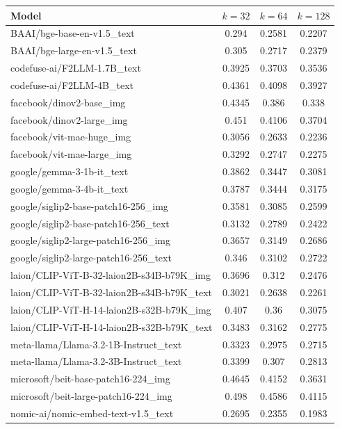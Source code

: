 \begin{table}[ht]
\centering
\begin{tabular}{lccc}
\hline
Model & $k=32$ & $k=64$ & $k=128$ \\
\hline
BAAI/bge-base-en-v1.5\_text & 0.294 & 0.2581 & 0.2207 \\
BAAI/bge-large-en-v1.5\_text & 0.305 & 0.2717 & 0.2379 \\
codefuse-ai/F2LLM-1.7B\_text & 0.3925 & 0.3703 & 0.3536 \\
codefuse-ai/F2LLM-4B\_text & 0.4361 & 0.4098 & 0.3927 \\
facebook/dinov2-base\_img & 0.4345 & 0.386 & 0.338 \\
facebook/dinov2-large\_img & 0.451 & 0.4106 & 0.3704 \\
facebook/vit-mae-huge\_img & 0.3056 & 0.2633 & 0.2236 \\
facebook/vit-mae-large\_img & 0.3292 & 0.2747 & 0.2275 \\
google/gemma-3-1b-it\_text & 0.3862 & 0.3447 & 0.3081 \\
google/gemma-3-4b-it\_text & 0.3787 & 0.3444 & 0.3175 \\
google/siglip2-base-patch16-256\_img & 0.3581 & 0.3085 & 0.2599 \\
google/siglip2-base-patch16-256\_text & 0.3132 & 0.2789 & 0.2422 \\
google/siglip2-large-patch16-256\_img & 0.3657 & 0.3149 & 0.2686 \\
google/siglip2-large-patch16-256\_text & 0.346 & 0.3102 & 0.2722 \\
laion/CLIP-ViT-B-32-laion2B-s34B-b79K\_img & 0.3696 & 0.312 & 0.2476 \\
laion/CLIP-ViT-B-32-laion2B-s34B-b79K\_text & 0.3021 & 0.2638 & 0.2261 \\
laion/CLIP-ViT-H-14-laion2B-s32B-b79K\_img & 0.407 & 0.36 & 0.3075 \\
laion/CLIP-ViT-H-14-laion2B-s32B-b79K\_text & 0.3483 & 0.3162 & 0.2775 \\
meta-llama/Llama-3.2-1B-Instruct\_text & 0.3323 & 0.2975 & 0.2715 \\
meta-llama/Llama-3.2-3B-Instruct\_text & 0.3399 & 0.307 & 0.2813 \\
microsoft/beit-base-patch16-224\_img & 0.4645 & 0.4152 & 0.3631 \\
microsoft/beit-large-patch16-224\_img & 0.498 & 0.4586 & 0.4115 \\
nomic-ai/nomic-embed-text-v1.5\_text & 0.2695 & 0.2355 & 0.1983 \\

\end{tabular}
\end{table}
